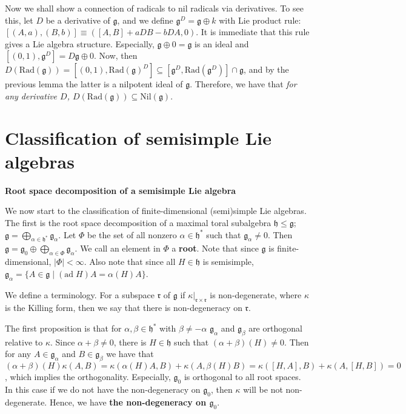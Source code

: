 \documentclass{article}
\newcommand{\SBar}{\;|\;}
\newcommand{\lie}[1]{\mathfrak{#1}}
\newcommand{\ad}[1]{\mathrm{ad}\; #1}
\newcommand{\Rad}[1]{\mathrm{Rad}(#1)}
\newcommand{\Nil}[1]{\mathrm{Nil}(#1)}
\begin{document}
Now we shall show a connection of radicals to nil radicals via derivatives.
To see this, let $D$ be a derivative of $\lie{g}$, and we define $\lie{g}^D = \lie{g} \oplus k$ with Lie product rule: $[(A, a), (B, b)] \equiv ([A, B] + aDB - bDA, 0)$.
It is immediate that this rule gives a Lie algebra structure.
Especially, $\lie{g} \oplus 0 = \lie{g}$ is an ideal and $[(0, 1), \lie{g}^D] = D\lie{g} \oplus 0$.
Now, then $D(\Rad{\lie{g}}) = [(0, 1), \Rad{\lie{g}}^D] \subseteq [\lie{g}^D, \Rad{\lie{g}^D}] \cap \lie{g}$, and by the previous lemma the latter is a nilpotent ideal of $\lie{g}$.
Therefore, we have that \textit{for any derivative $D$, $D(\Rad{\lie{g}}) \subseteq \Nil{\lie{g}}$}.

\newpage

\part{Classification of semisimple Lie algebras}

\newpage

\textbf{Root space decomposition of a semisimple Lie algebra}

We now start to the classification of finite-dimensional (semi)simple Lie algebras.
The first is the root space decomposition of a maximal toral subalgebra $\lie{h} \le \lie{g}$; $\lie{g} = \bigoplus_{\alpha \in \lie{h}^*} \lie{g}_\alpha$.
Let $\Phi$ be the set of all nonzero $\alpha \in \lie{h}^*$ such that $\lie{g}_\alpha \ne 0$.
Then $\lie{g} = \lie{g}_0 \oplus \bigoplus_{\alpha \in \Phi} \lie{g}_\alpha$.
We call an element in $\Phi$ a \textbf{root}.
Note that since $\lie{g}$ is finite-dimensional, $|\Phi| < \infty$.
Also note that since all $H \in \lie{h}$ is semisimple, $\lie{g}_\alpha = \{A \in \lie{g} \SBar (\ad{H})A = \alpha(H)A\}$.

We define a terminology.
For a subspace $\lie{r}$ of $\lie{g}$ if $\kappa|_{\lie{r} \times \lie{r}}$ is non-degenerate, where $\kappa$ is the Killing form, then we say that there is non-degeneracy on $\lie{r}$.

The first proposition is that for $\alpha, \beta \in \lie{h}^*$ with $\beta \ne -\alpha$ $\lie{g}_\alpha$ and $\lie{g}_\beta$ are orthogonal relative to $\kappa$.
Since $\alpha + \beta \ne 0$, there is $H \in \lie{h}$ such that $(\alpha + \beta)(H) \ne 0$.
Then for any $A \in \lie{g}_\alpha$ and $B \in \lie{g}_\beta$ we have that $(\alpha + \beta)(H) \kappa(A, B) = \kappa(\alpha(H) A, B) + \kappa(A, \beta(H) B) = \kappa([H, A], B) + \kappa(A, [H, B]) = 0$, which implies the orthogonality.
Especially, $\lie{g}_0$ is orthogonal to all root spaces.
In this case if we do not have the non-degeneracy on $\lie{g}_0$, then $\kappa$ will be not non-degenerate.
Hence, we have \textbf{the non-degeneracy on $\lie{g}_0$}.
\end{document}
